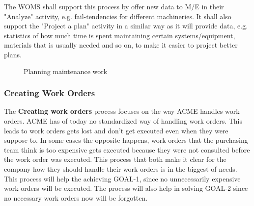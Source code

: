 The WOMS shall support this process by offer new data to M/E in their "Analyze" activity, e.g. fail-tendencies for different machineries. It shall also support the "Project a plan" activity in a similar way as it will provide data, e.g. statistics of how much time is spent maintaining certain systems/equipment, materials that is usually needed and so on, to make it easier to project better plans.
\begin{figure}[H]
	\centering
	\setlength\fboxsep{7pt}
	\setlength\fboxrule{0.5pt}
	\caption{Planning maintenance work}
	\label{fig:planning}
\end{figure}
%
\subsubsection{Creating Work Orders}
\label{sec:bp2}
The \textbf{Creating work orders} process focuses on the way ACME handles work orders. ACME has of today no standardized way of handling work orders. This leads to work orders gets lost and don't get executed even when they were suppose to. In some cases the opposite happens, work orders that the purchasing team think is too expensive gets executed because they were not consulted before the work order was executed. This process that both make it clear for the company how they should handle their work orders is in the biggest of needs. This process will help the achieving GOAL-1, since no unnecessarily expensive work orders will be executed. The process will also help in solving GOAL-2 since no necessary work orders now will be forgotten. 

